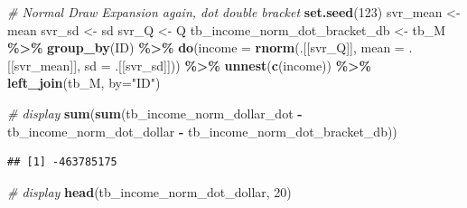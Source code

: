 \documentclass[
]{book}
\newenvironment{Shaded}{\begin{snugshade}}{\end{snugshade}}
\newcommand{\CommentTok}[1]{\textcolor[rgb]{0.56,0.35,0.01}{\textit{#1}}}
\newcommand{\DataTypeTok}[1]{\textcolor[rgb]{0.13,0.29,0.53}{#1}}
\newcommand{\DecValTok}[1]{\textcolor[rgb]{0.00,0.00,0.81}{#1}}
\newcommand{\KeywordTok}[1]{\textcolor[rgb]{0.13,0.29,0.53}{\textbf{#1}}}
\newcommand{\NormalTok}[1]{#1}
\newcommand{\OperatorTok}[1]{\textcolor[rgb]{0.81,0.36,0.00}{\textbf{#1}}}
\newcommand{\StringTok}[1]{\textcolor[rgb]{0.31,0.60,0.02}{#1}}
\begin{document}
\begin{Shaded}
\begin{Highlighting}[]
\CommentTok{\# Normal Draw Expansion again, dot double bracket}
\KeywordTok{set.seed}\NormalTok{(}\StringTok{\textquotesingle{}123\textquotesingle{}}\NormalTok{)}
\NormalTok{svr\_mean \textless{}{-}}\StringTok{ \textquotesingle{}mean\textquotesingle{}}
\NormalTok{svr\_sd \textless{}{-}}\StringTok{ \textquotesingle{}sd\textquotesingle{}}
\NormalTok{svr\_Q \textless{}{-}}\StringTok{ \textquotesingle{}Q\textquotesingle{}}
\NormalTok{tb\_income\_norm\_dot\_bracket\_db \textless{}{-}}\StringTok{ }\NormalTok{tb\_M }\OperatorTok{\%\textgreater{}\%}\StringTok{ }\KeywordTok{group\_by}\NormalTok{(ID) }\OperatorTok{\%\textgreater{}\%}
\StringTok{  }\KeywordTok{do}\NormalTok{(}\DataTypeTok{income =} \KeywordTok{rnorm}\NormalTok{(.[[svr\_Q]],}
                    \DataTypeTok{mean =}\NormalTok{ .[[svr\_mean]],}
                    \DataTypeTok{sd =}\NormalTok{ .[[svr\_sd]])) }\OperatorTok{\%\textgreater{}\%}
\StringTok{  }\KeywordTok{unnest}\NormalTok{(}\KeywordTok{c}\NormalTok{(income)) }\OperatorTok{\%\textgreater{}\%}
\StringTok{  }\KeywordTok{left\_join}\NormalTok{(tb\_M, }\DataTypeTok{by=}\StringTok{"ID"}\NormalTok{)}

\CommentTok{\# display}
\KeywordTok{sum}\NormalTok{(}\KeywordTok{sum}\NormalTok{(tb\_income\_norm\_dollar\_dot }\OperatorTok{{-}}\StringTok{ }\NormalTok{tb\_income\_norm\_dot\_dollar }\OperatorTok{{-}}\StringTok{ }\NormalTok{tb\_income\_norm\_dot\_bracket\_db))}
\end{Highlighting}
\end{Shaded}

\begin{verbatim}
## [1] -463785175
\end{verbatim}

\begin{Shaded}
\begin{Highlighting}[]
\CommentTok{\# display}
\KeywordTok{head}\NormalTok{(tb\_income\_norm\_dot\_dollar, }\DecValTok{20}\NormalTok{)}
\end{Highlighting}
\end{Shaded}

\begin{Shaded}
\end{Shaded}
\end{document}
